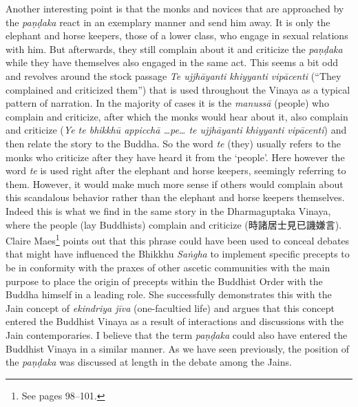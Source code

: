 Another interesting point is that the monks and novices that are approached by the {\em paṇḍaka} react in an exemplary manner and send him away. It is only the elephant and horse keepers, those of a lower class, who engage in sexual relations with him. But afterwards, they still complain about it and criticize the {\em paṇḍaka} while they have themselves also engaged in the same act. This seems a bit odd and revolves around the stock passage {\em Te ujjhāyanti khiyyanti vipācenti} (``They complained and criticized them'') that is used throughout the Vinaya as a typical pattern of narration. In the majority of cases it is the {\em manussā} (people) who complain and criticize, after which the monks would hear about it, also complain and criticize ({\em Ye te bhikkhū appicchā …pe… te ujjhāyanti khiyyanti vipācenti}) and then relate the story to the Buddha. So the word {\em te} (they) usually refers to the monks who criticize after they have heard it from the `people'. Here however the word {\em te} is used right after the elephant and horse keepers, seemingly referring to them. However, it would make much more sense if others would complain about this scandalous behavior rather than the elephant and horse keepers themselves. Indeed this is what we find in the same story in the Dharmaguptaka Vinaya, where the people (lay Buddhists) complain and criticize (時諸居士見已譏嫌言). Claire Maes\footnote{See \cite{maes2011} pages 98–101.} points out that this phrase could have been used to conceal debates that might have influenced the Bhikkhu {\em Saṅgha} to implement specific precepts to be in conformity with the praxes of other ascetic communities with the main purpose to place the origin of precepts within the Buddhist Order with the Buddha himself in a leading role. She successfully demonstrates this with the Jain concept of {\em ekindriya jīva} (one-facultied life) and argues that this concept entered the Buddhist Vinaya as a result of interactions and discussions with the Jain contemporaries. I believe that the term {\em paṇḍaka} could also have entered the Buddhist Vinaya in a similar manner. As we have seen previously, the position of the {\em paṇḍaka} was discussed at length in the debate among the Jains.

